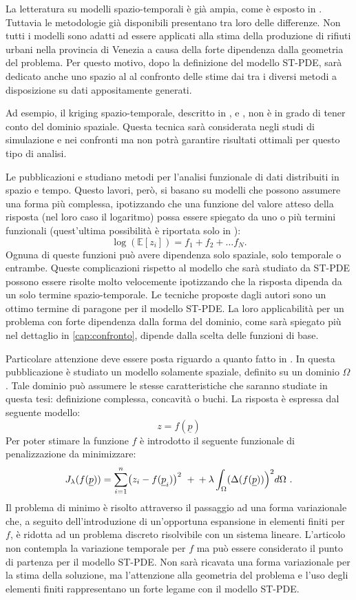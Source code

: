 \documentclass[a4paper,11pt,twoside,openright]{book}							%
\begin{document}
La letteratura su modelli spazio-temporali è già ampia, come è esposto in \cite{art:cressie}. Tuttavia le metodologie già disponibili presentano tra loro delle differenze. Non tutti i modelli sono adatti ad essere applicati alla stima della produzione di rifiuti urbani nella provincia di Venezia a causa della forte dipendenza dalla geometria del problema. Per questo motivo, dopo la definizione del modello ST-PDE, sarà dedicato anche uno spazio al al confronto delle stime dai tra i diversi metodi a disposizione su dati appositamente generati.

Ad esempio, il kriging spazio-temporale, descritto in \cite{art:caballero}, \cite{art:menafoglio1} e \cite{art:menafoglio1}, non è in grado di tener conto del dominio spaziale. Questa tecnica sarà considerata negli studi di simulazione e nei confronti ma non potrà garantire risultati ottimali per questo tipo di analisi.

Le pubblicazioni \cite{art:augustin} e \cite{art:marra} studiano metodi per l'analisi funzionale di dati distribuiti in spazio e tempo. Questo lavori, però, si basano su modelli che possono assumere una forma più complessa, ipotizzando che una funzione del valore atteso della risposta (nel loro caso il logaritmo) possa essere spiegato da uno o più termini funzionali (quest'ultima possibilità è riportata solo in \cite{art:augustin}):
$$
\log(\mathbb{E}[z_i])= f_1+f_2+ \ldots f_N .
$$
Ognuna di queste funzioni può avere dipendenza solo spaziale, solo temporale o entrambe. Queste complicazioni rispetto al modello che sarà studiato da ST-PDE possono essere risolte molto velocemente ipotizzando che la risposta dipenda da un solo termine spazio-temporale. Le tecniche proposte dagli autori sono un ottimo termine di paragone per il modello ST-PDE. La loro applicabilità per un problema con forte dipendenza dalla forma del dominio, come sarà spiegato più nel dettaglio in \ref{cap:confronto}, dipende dalla scelta delle funzioni di base. 

Particolare attenzione deve essere posta riguardo a quanto fatto in \cite{art:sangalli}. In questa pubblicazione è studiato un modello solamente spaziale, definito su un dominio $\Omega$. Tale dominio può assumere le stesse caratteristiche che saranno studiate in questa tesi: definizione complessa, concavità o buchi. La risposta è espressa dal seguente modello:
$$
z=f(\underline{p})
$$
Per poter stimare la funzione $f$ è introdotto il seguente funzionale di penalizzazione da minimizzare:
$$
J_{\lambda }(f(\underline p))=\sum_{i=1}^n \bigl( z_{i} - f(\underline p_i) \bigr)^2 \ + \\
+\lambda\int_{\Omega} ( \Delta(  f(\underline p)  ) \Bigr)^2 d \Omega \ .
$$
Il problema di minimo è risolto attraverso il passaggio ad una forma variazionale che, a seguito dell'introduzione di un'opportuna espansione in elementi finiti per $f$, è ridotta ad un problema discreto risolvibile con un sistema lineare. L'articolo \cite{art:sangalli} non contempla la variazione temporale per $f$ ma può essere considerato il punto di partenza per il modello ST-PDE. Non sarà ricavata una forma variazionale per la stima della soluzione, ma l'attenzione alla geometria del problema e l'uso degli elementi finiti rappresentano un forte legame con il modello ST-PDE.
\end{document}
